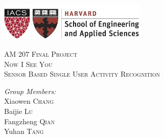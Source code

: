\documentclass[10pt,letter]{article}
\numberwithin{equation}{section} %
\numberwithin{figure}{section} %
\numberwithin{table}{section} %
\begin{document}
\begin{titlepage}

\newcommand{\HRule}{\rule{\linewidth}{0.5mm}} %

\includegraphics[width=7cm]{../plot/logo.png}\\[2cm] 
\center %

\textsc{\Huge AM 207 Final Project}\\[1.5cm] %
\textsc{\LARGE Now I See You}\\[0.5cm] %
\textsc{\Large Sensor Based Single User Activity Recognition}\\[3cm] %
 

\begin{minipage}{0.4\textwidth}
\center \large
\emph{Group Members:}\\[0.4cm]
Xiaowen \textsc{Chang} \\
Baijie \textsc{Lu}\\ 
Fangzheng \textsc{Qian} \\
Yuhan \textsc{Tang} 
\end{minipage}
 

\vfill %

\end{titlepage}
\end{document}
